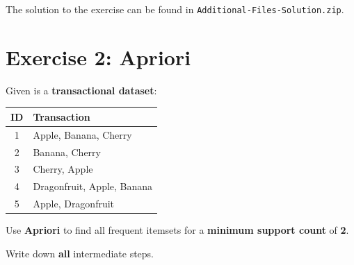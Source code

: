 \documentclass[
english,
smallborders
]{i6prcsht}
\begin{document}
\begin{solution}	
	The solution to the exercise can be found in \texttt{Additional-Files-Solution.zip}.
\end{solution}

\section*{Exercise 2: Apriori}

Given is a \textbf{transactional dataset}:

\begin{center}	
	\begin{tabular}{|c|l|}
		\hline
		\textbf{ID} & \textbf{Transaction}       \\
		\hline
		1           & Apple, Banana, Cherry      \\
		\hline
		2           & Banana, Cherry             \\
		\hline
		3           & Cherry, Apple              \\
		\hline
		4           & Dragonfruit, Apple, Banana \\
		\hline
		5           & Apple, Dragonfruit         \\
		\hline
	\end{tabular}
\end{center}

Use \textbf{Apriori} to find all frequent itemsets for a \textbf{minimum support count} of \textbf{2}.

Write down \textbf{all} intermediate steps.
\end{document}
